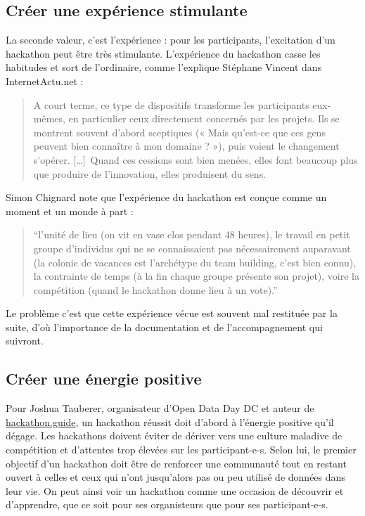 \documentclass[]{book}
\begin{document}
\subsection{Créer une expérience
stimulante}\label{creer-une-experience-stimulante}

La seconde valeur, c'est l'expérience : pour les participants,
l'excitation d'un hackathon peut être très stimulante. L'expérience du
hackathon casse les habitudes et sort de l'ordinaire, comme l'explique
Stéphane Vincent dans InternetActu.net :

\begin{quote}
A court terme, ce type de dispositifs transforme les participants
eux-mêmes, en particulier ceux directement concernés par les projets.
Ils se montrent souvent d'abord sceptiques (« Mais qu'est-ce que ces
gens peuvent bien connaître à mon domaine ? »), puis voient le
changement s'opérer. {[}\ldots{}{]}~Quand ces cessions sont bien menées,
elles font beaucoup plus que produire de l'innovation, elles produisent
du sens.
\end{quote}

Simon Chignard note que l'expérience du hackathon est conçue comme un
moment et un monde à part :

\begin{quote}
``l'unité de lieu (on vit en vase clos pendant 48 heures), le travail en
petit groupe d'individus qui ne se connaissaient pas nécessairement
auparavant (la colonie de vacances est l'archétype du team building,
c'est bien connu), la contrainte de temps (à la fin chaque groupe
présente son projet), voire la compétition (quand le hackathon donne
lieu à un vote).''
\end{quote}

Le problème c'est que cette expérience vécue est souvent mal restituée
par la suite, d'où l'importance de la documentation et de
l'accompagnement qui suivront.

\subsection{Créer une énergie
positive}\label{creer-une-energie-positive}

Pour Joshua Tauberer, organisateur d'Open Data Day DC et auteur de
\href{https://hackathon.guide/}{hackathon.guide}, un hackathon réussit
doit d'abord à l'énergie positive qu'il dégage. Les hackathons doivent
éviter de dériver vers une culture maladive de compétition et d'attentes
trop élevées sur les participant-e-s. Selon lui, le premier objectif
d'un hackathon doit être de renforcer une communauté tout en restant
ouvert à celles et ceux qui n'ont jusqu'alors pas ou peu utilisé de
données dans leur vie. On peut ainsi voir un hackathon comme une
occasion de découvrir et d'apprendre, que ce soit pour ses organisteurs
que pour ses participant-e-s.
\end{document}
